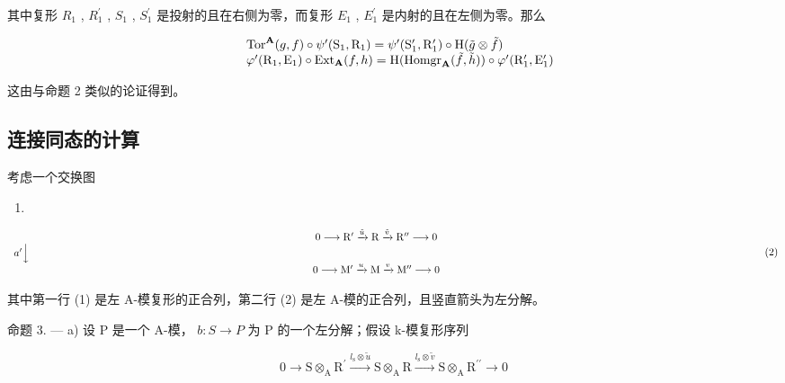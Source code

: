 其中复形 \(R_{1}\) , \(R_{1}^{\prime}\) , \(S_{1}\) , \(S_{1}^{\prime}\) 是投射的且在右侧为零，而复形 \(E_{1}\) , \(E_{1}^{\prime}\) 是内射的且在左侧为零。那么

\[
\begin{array}{r l} & {\mathrm{Tor} ^ {\mathbf {A}} (g, f) \circ \psi^ {\prime} (\mathrm{S} _ {1}, \mathrm{R} _ {1}) = \psi^ {\prime} (\mathrm{S} _ {1} ^ {\prime}, \mathrm{R} _ {1} ^ {\prime}) \circ \mathrm{H} (\tilde {g} \otimes \tilde {f})} \\ & {\varphi^ {\prime} (\mathrm{R} _ {1}, \mathrm{E} _ {1}) \circ \mathrm{Ext} _ {\mathbf {A}} (f, h) = \mathrm{H} (\mathrm{Homgr} _ {\mathbf {A}} (\tilde {f}, \tilde {h})) \circ \varphi^ {\prime} (\mathrm{R} _ {1} ^ {\prime}, \mathrm{E} _ {1} ^ {\prime})} \end{array}
\]

这由与命题 2 类似的论证得到。

\subsection{连接同态的计算}

考虑一个交换图

\begin{enumerate}
\def\labelenumi{(\arabic{enumi})}
\tightlist
\item
\end{enumerate}

\[
\begin{array}{c} 0 \longrightarrow \mathrm{R} ^ {\prime} \xrightarrow {\tilde {u}} \mathrm{R} \xrightarrow {\tilde {v}} \mathrm{R} ^ {\prime \prime} \longrightarrow 0 \\ a ^ {\prime} \Big \downarrow \qquad \qquad \qquad \qquad \qquad \qquad \qquad \qquad \qquad \qquad \qquad \qquad \qquad \qquad \qquad \qquad \qquad \qquad \qquad \qquad \qquad \qquad \qquad \qquad \qquad \qquad \qquad \qquad \qquad \qquad \qquad \qquad \qquad \qquad \\ 0 \longrightarrow \mathrm{M} ^ {\prime} \xrightarrow {u} \mathrm{M} \xrightarrow {v} \mathrm{M} ^ {\prime \prime} \longrightarrow 0 \end{array}\tag{2}
\]

其中第一行 (1) 是左 A-模复形的正合列，第二行 (2) 是左 A-模的正合列，且竖直箭头为左分解。

命题 3. --- a) 设 P 是一个 A-模， \(b: S \to P\) 为 P 的一个左分解；假设 k-模复形序列

\[
0 \rightarrow \mathrm{S} \otimes_ {\mathrm{A}} \mathrm{R} ^ {\prime} \xrightarrow {l _ {\mathrm{s}} \otimes \tilde {u}} \mathrm{S} \otimes_ {\mathrm{A}} \mathrm{R} \xrightarrow {l _ {\mathrm{s}} \otimes \tilde {v}} \mathrm{S} \otimes_ {\mathrm{A}} \mathrm{R} ^ {\prime \prime} \rightarrow 0\tag{3}
\]


